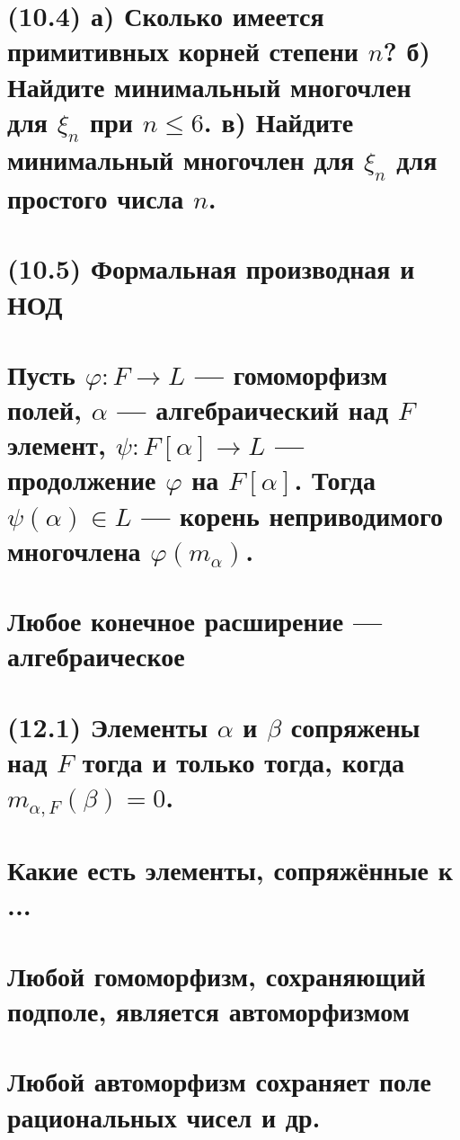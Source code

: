 \section{(10.4) а) Сколько имеется примитивных корней степени $n$? б) Найдите минимальный многочлен
для $\xi_n$ при $n \leq 6$. в) Найдите минимальный многочлен для $\xi_n$ для простого числа $n$.}

\newpage

\section{(10.5) Формальная производная и НОД}


\section{Пусть $\varphi:F \rightarrow L$ — гомоморфизм полей, $\alpha$ — алгебраический над $F$ элемент, $\psi: F[\alpha] \rightarrow L$ — продолжение $\varphi$ на $F[\alpha]$. Тогда $\psi(\alpha)\in L$ — корень неприводимого многочлена $\varphi(m_\alpha)$.}

\newpage{}

\section{ Любое конечное расширение — алгебраическое}


\section{(12.1) Элементы $\alpha$ и $\beta$ сопряжены над $F$ тогда и только тогда, когда $m_{\alpha,F} (\beta) = 0$.}


\section{Какие есть элементы, сопряжённые к ...}


\section{Любой гомоморфизм, сохраняющий подполе, является автоморфизмом}


\section{Любой автоморфизм сохраняет поле рациональных чисел и др.}


